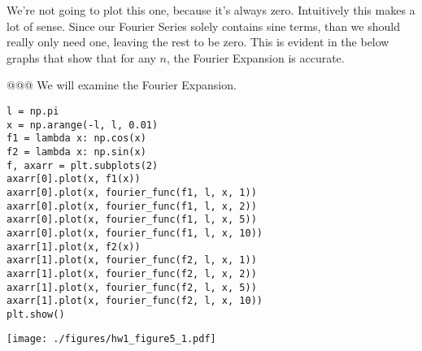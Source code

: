 \documentclass[10pt]{article}
\begin{document}
\begin{easylist}[enumerate]
    We're not going to plot this one, because it's always zero. Intuitively this makes a lot of sense. Since our Fourier
    Series solely contains sine terms, than we should really only need one, leaving the rest to be zero. This is evident
    in the below graphs that show that for any $n$, the Fourier Expansion is accurate.

    @@@ We will examine the Fourier Expansion.

\hfill\begin{minipage}{\dimexpr\textwidth-1cm}

\begin{verbatim}
l = np.pi
x = np.arange(-l, l, 0.01)
f1 = lambda x: np.cos(x)
f2 = lambda x: np.sin(x)
f, axarr = plt.subplots(2)
axarr[0].plot(x, f1(x))
axarr[0].plot(x, fourier_func(f1, l, x, 1))
axarr[0].plot(x, fourier_func(f1, l, x, 2))
axarr[0].plot(x, fourier_func(f1, l, x, 5))
axarr[0].plot(x, fourier_func(f1, l, x, 10))
axarr[1].plot(x, f2(x))
axarr[1].plot(x, fourier_func(f2, l, x, 1))
axarr[1].plot(x, fourier_func(f2, l, x, 2))
axarr[1].plot(x, fourier_func(f2, l, x, 5))
axarr[1].plot(x, fourier_func(f2, l, x, 10))
plt.show()
\end{verbatim}
\texttt{[image: ./figures/hw1\_figure5\_1.pdf]}

\xdef\tpd{\the\prevdepth}
\end{minipage}\\
\end{easylist}
\end{document}
